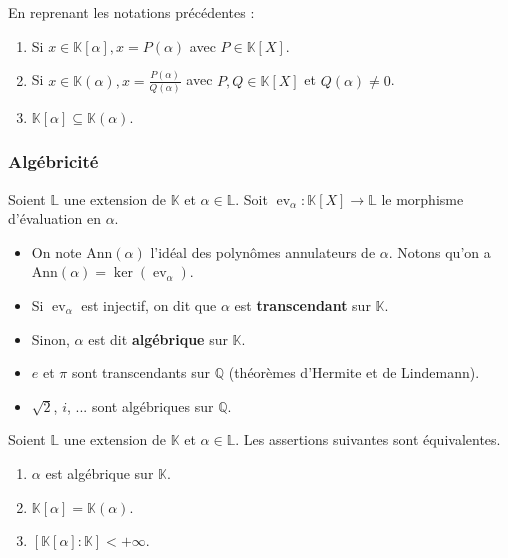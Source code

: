   \begin{proposition}
    En reprenant les notations précédentes :
    \begin{enumerate}[label={\bfseries(\roman*)}]
      \item Si $x \in \mathbb{K}[\alpha], x = P(\alpha)$ avec $P \in \mathbb{K}[X]$.
      \item Si $x \in \mathbb{K}(\alpha), x = \frac{P(\alpha)}{Q(\alpha)}$ avec $P, Q \in \mathbb{K}[X]$ et $Q(\alpha) \neq 0$.
      \item $\mathbb{K}[\alpha] \subseteq \mathbb{K}(\alpha)$.
    \end{enumerate}
  \end{proposition}

  \subsubsection{Algébricité}

  \begin{definition}
    Soient $\mathbb{L}$ une extension de $\mathbb{K}$ et $\alpha \in \mathbb{L}$. Soit $\operatorname{ev}_\alpha : \mathbb{K}[X] \rightarrow \mathbb{L}$ le morphisme d'évaluation en $\alpha$.
    \begin{itemize}
      \item On note $\mathrm{Ann}(\alpha)$ l'idéal des polynômes annulateurs de $\alpha$. Notons qu'on a $\mathrm{Ann}(\alpha) = \ker(\operatorname{ev}_\alpha)$.
      \item Si $\operatorname{ev}_\alpha$ est injectif, on dit que $\alpha$ est \textbf{transcendant} sur $\mathbb{K}$.
      \item Sinon, $\alpha$ est dit \textbf{algébrique} sur $\mathbb{K}$.
    \end{itemize}
  \end{definition}

  \begin{example}
    \begin{itemize}
      \item $e$ et $\pi$ sont transcendants sur $\mathbb{Q}$ (théorèmes d'Hermite et de Lindemann).
      \item $\sqrt{2}$, $i$, ... sont algébriques sur $\mathbb{Q}$.
    \end{itemize}
  \end{example}

  \begin{proposition}
    Soient $\mathbb{L}$ une extension de $\mathbb{K}$ et $\alpha \in \mathbb{L}$. Les assertions suivantes sont équivalentes.
    \begin{enumerate}[label={\bfseries(\roman*)}]
      \item $\alpha$ est algébrique sur $\mathbb{K}$.
      \item $\mathbb{K}[\alpha] = \mathbb{K}(\alpha)$.
      \item $[\mathbb{K}[\alpha]:\mathbb{K}] < +\infty$.
    \end{enumerate}
  \end{proposition}

